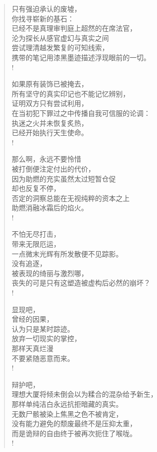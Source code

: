 \documentclass[UTF8, 12pt, a4paper]{ctexrep} %
\begin{document}
\begin{verse}

    只有强迫承认的废墟，\\
    你找寻崭新的基石：\\
    已经不是真理审判庭上超然的在席法官，\\
    沦为探长从感官虚幻与真实之间\\
    尝试理清越发繁复的可知线索，\\
    携带的笔记用漆黑墨迹描述浮现眼前的一切。\\!

    如果原有装饰已被掩去，\\
    所有坚守的真实印记也不能记忆辨别，\\
    证明双方只有尝试利用，\\
    在当初犯下罪过之中传播自我可信服的论调：\\
    执迷之火并未恢复炙热，\\
    已经开始执行天生使命。\\!

    那么啊，永远不要怜惜\\
    被打倒便注定付出的代价，\\
    因为助燃的充实虽然太过短暂仓促\\
    却也反复不停，\\
    否定的洞察总能在无视纯粹的资本之上\\
    助燃消融冰霜后的焰火。\\!

    不怕无尽打击，\\
    带来无限厄运，\\
    一点微末光辉有所发散便不见踪影。\\
    没有追逐，\\
    被表现的绮丽与激烈哪，\\
    丧失的可是只有这塑造被虚构后必然的崩坏？\\!

    显现吧，\\
    曾经的因果，\\
    认为只是某时踪迹。\\
    放弃一切现实的掌控，\\
    那样天真烂漫\\
    不要紧随恶意而来。\\!

    辩护吧，\\
    理想大厦将倾未倒会以为糅合的混杂给予新生，\\
    那样单纯洁白永远抗拒暗藏的真实。\\
    无数尸骸被染上焦黑之色不被肯定，\\
    没有能力避免的颓废最终不是压抑太重，\\
    而是诡辩的自由终于被再次扼住了喉咙。\\!


\end{verse}
\end{document}
